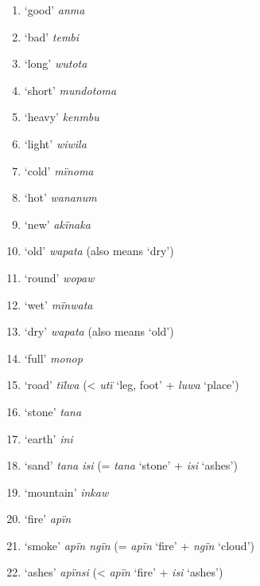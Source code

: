 \begin{enumerate}[noitemsep, label={\arabic*}, align=left, widest=190, labelsep=1ex,leftmargin=*]
\item  ‘good’ \textit{anma}

\item  ‘bad’ \textit{tembi}

\item  ‘long’ \textit{wutota}

\item  ‘short’ \textit{mundotoma}

\item  ‘heavy’ \textit{kenmbu}

\item  ‘light’ \textit{wiwila}

\item  ‘cold’ \textit{mïnoma}

\item  ‘hot’ \textit{wananum}

\item  ‘new’ \textit{akïnaka}

\item  ‘old’ \textit{wapata} (also means ‘dry’)

\item  ‘round’ \textit{wopaw}

\item  ‘wet’ \textit{mïnwata}

\item  ‘dry’ \textit{wapata} (also means ‘old’)

\item  ‘full’ \textit{monop}


\item  ‘road’ \textit{tïlwa} (< \textit{utï} ‘leg, foot’ + \textit{luwa} ‘place’)

\item  ‘stone’ \textit{tana}

\item  ‘earth’ \textit{ini}

\item  ‘sand’ \textit{tana isi} (= \textit{tana} ‘stone’ + \textit{isi} ‘ashes’)

\item  ‘mountain’ \textit{inkaw}

\item  ‘fire’ \textit{apïn}

\item  ‘smoke’ \textit{apïn ngïn} (= \textit{apïn} ‘fire’ + \textit{ngïn} ‘cloud’)

\item  ‘ashes’ \textit{apïnsi} (< \textit{apïn} ‘fire’ + \textit{isi} ‘ashes’)


\end{enumerate}
